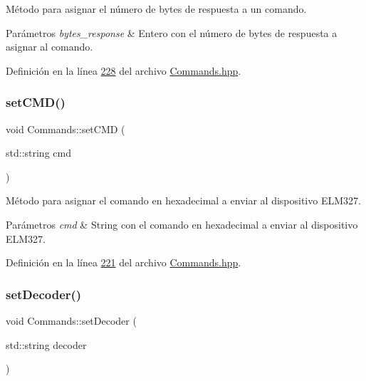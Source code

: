 Método para asignar el número de bytes de respuesta a un comando. 


\begin{DoxyParams}{Parámetros}
{\em bytes\+\_\+response} & Entero con el número de bytes de respuesta a asignar al comando. \\
\hline
\end{DoxyParams}


Definición en la línea \hyperlink{Commands_8hpp_source_l00228}{228} del archivo \hyperlink{Commands_8hpp_source}{Commands.\+hpp}.

\mbox{\label{classCommands_a8ef86479788a98de99cc6ad6a78da9a4}} 
\subsubsection{\texorpdfstring{set\+C\+M\+D()}{setCMD()}}
{\footnotesize\ttfamily void Commands\+::set\+C\+MD (\begin{DoxyParamCaption}\item[{std\+::string}]{cmd }\end{DoxyParamCaption})\hspace{0.3cm}{\ttfamily [inline]}}



Método para asignar el comando en hexadecimal a enviar al dispositivo E\+L\+M327. 


\begin{DoxyParams}{Parámetros}
{\em cmd} & String con el comando en hexadecimal a enviar al dispositivo E\+L\+M327. \\
\hline
\end{DoxyParams}


Definición en la línea \hyperlink{Commands_8hpp_source_l00221}{221} del archivo \hyperlink{Commands_8hpp_source}{Commands.\+hpp}.

\mbox{\label{classCommands_acf92f3f0134534808bf6dcfb4496cf97}} 
\subsubsection{\texorpdfstring{set\+Decoder()}{setDecoder()}}
{\footnotesize\ttfamily void Commands\+::set\+Decoder (\begin{DoxyParamCaption}\item[{std\+::string}]{decoder }\end{DoxyParamCaption})\hspace{0.3cm}{\ttfamily [inline]}}



